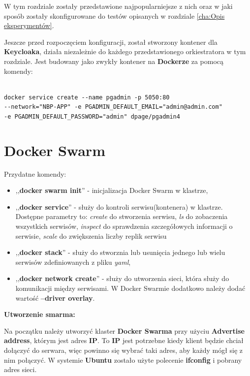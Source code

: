 \documentclass{iiuwb}
\begin{document}
W tym rozdziale zostały przedstawione najpopularniejsze 
z nich oraz w jaki sposób zostały skonfigurowane do 
testów opisanych w rozdziale \ref{cha:Opis eksperymentów}.

Jeszcze przed rozpoczęciem konfiguracji, został stworzony 
kontener dla \textbf{Keycloaka}, działa niezależnie do każdego
przedstawionego orkiestratora w tym rozdziale. Jest budowany 
jako zwykły kontener na \textbf{Dockerze} za pomocą komendy:


\begin{lstlisting}[breaklines=true]

docker service create --name pgadmin -p 5050:80 
--network="NBP-APP" -e PGADMIN_DEFAULT_EMAIL="admin@admin.com" 
-e PGADMIN_DEFAULT_PASSWORD="admin" dpage/pgadmin4 

\end{lstlisting}

\section{Docker Swarm}
\label{sec:Docker Swarm}

Przydatne komendy:

\begin{itemize}
\item ,,\textbf{docker swarm init}'' - inicjalizacja Docker Swarm w klastrze, 
\item ,,\textbf{docker service}'' - służy do kontroli serwisu(kontenera) w klastrze. Dostępne parametry to:
\textit{create} do stworzenia serwisu, \textit{ls} do zobaczenia wszystkich serwisów,
\textit{inspect} do sprawdzenia szczegółowych informacji o serwisie,
\textit{scale} do zwiększenia liczby replik serwisu
\item ,,\textbf{docker stack}'' - służy do stworznia lub usunięcia jednego lub wielu serwisów 
zdefiniowanych z pliku \textit{yaml},
\item ,,\textbf{docker network create}'' - służy do utworzenia sieci, która służy 
do komunikacji między serwisami. W Docker Swarmie dodatkowo 
należy dodać wartość \textbf{--driver overlay}.
\end{itemize}


\textbf{Utworzenie smarma:}

Na początku należy utworzyć klaster \textbf{Docker Swarma} przy użyciu \textbf{Advertise address}, którym
jest adres \textbf{IP}. To \textbf{IP} jest potrzebne kiedy klient będzie chciał dołączyć do serwara, więc powinno
się wybrać taki adres, aby każdy mógł się z nim połączyć. W systemie \textbf{Ubuntu} zostało użyte polecenie 
\textbf{ifconfig} i pobrany adres sieci.
\end{document}
